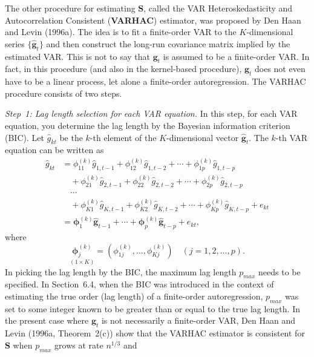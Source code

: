 The other procedure for estimating $\mathbf{S}$, called the VAR Heteroskedasticity and Autocorrelation
Consistent (\textbf{VARHAC}) estimator, was proposed by Den Haan and Levin
(1996a). The idea is to fit a finite-order VAR to the $K$-dimensional series $\{\hat{\mathbf{g}}_t\}$ and
then construct the long-run covariance matrix implied by the estimated VAR. This
is not to say that $\mathbf{g}_t$ is assumed to be a finite-order VAR. In fact, in this procedure
(and also in the kernel-based procedure), $\mathbf{g}_t$ does not even have to be a linear
process, let alone a finite-order autoregression.
The VARHAC procedure consists of two steps.

\medskip
\noindent\emph{Step~1: Lag length selection for each VAR equation.} \; In this step, for each VAR
equation, you determine the lag length by the Bayesian information criterion
(BIC). Let $\hat{g}_{kt}$ be the $k$-th element of the $K$-dimensional vector $\hat{\mathbf{g}}_t$.
The $k$-th VAR equation can be written as
\begin{equation}
\begin{aligned}
  \hat{g}_{kt} &= \phi_{11}^{(k)} \hat{g}_{1,t-1} + \phi_{12}^{(k)} \hat{g}_{1,t-2} + \cdots + \phi_{1p}^{(k)} \hat{g}_{1,t-p} \\
  &\quad + \phi_{21}^{(k)} \hat{g}_{2,t-1} + \phi_{22}^{(k)} \hat{g}_{2,t-2} + \cdots + \phi_{2p}^{(k)} \hat{g}_{2,t-p} \\
  &\quad \cdots \\
  &\quad + \phi_{K1}^{(k)} \hat{g}_{K,t-1} + \phi_{K2}^{(k)} \hat{g}_{K,t-2} + \cdots + \phi_{Kp}^{(k)} \hat{g}_{K,t-p} + e_{kt} \\
  &= \bm{\phi}_1^{(k)} \hat{\mathbf{g}}_{t-1} + \cdots + \bm{\phi}_p^{(k)} \hat{\mathbf{g}}_{t-p} + e_{kt},
\end{aligned}
\label{eq:6.6.10}
\end{equation}
where
\[
  \underset{(1 \times K)}{\bm{\phi}_j^{(k)}} = (\phi_{1j}^{(k)}, \ldots, \phi_{Kj}^{(k)})
  \quad (j = 1, 2, \ldots, p).
\]
In picking the lag length by the BIC, the maximum lag length $p_{max}$ needs
to be specified. In Section~6.4, when the BIC was introduced in the context
of estimating the true order (lag length) of a finite-order autoregression,
$p_{max}$ was set to some integer known to be greater than or equal to the
true lag length. In the present case where $\mathbf{g}_t$ is not necessarily a finite-order
VAR, Den Haan and Levin (1996a, Theorem~2(c)) show that the
VARHAC estimator is consistent for $\mathbf{S}$ when $p_{max}$ grows at rate $n^{1/3}$ and
